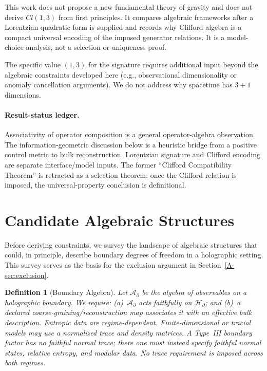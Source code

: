 \documentclass[12pt,a4paper,openany]{book}
\newtheorem{definition}[theorem]{Definition}
\begin{document}
This work does not propose a new fundamental theory of gravity and does not derive $Cl(1,3)$ from first principles.  It compares algebraic frameworks after a Lorentzian quadratic form is supplied and records why Clifford algebra is a compact universal encoding of the imposed generator relations.  It is a model-choice analysis, not a selection or uniqueness proof.

The specific value $(1,3)$ for the signature requires additional input beyond the algebraic constraints developed here (e.g., observational dimensionality or anomaly cancellation arguments).
We do not address why spacetime has $3+1$ dimensions.

\paragraph{Result-status ledger.}
Associativity of operator composition is a general operator-algebra observation.  The information-geometric discussion below is a heuristic bridge from a positive control metric to bulk reconstruction.  Lorentzian signature and Clifford encoding are separate interface/model inputs.  The former ``Clifford Compatibility Theorem'' is retracted as a selection theorem: once the Clifford relation is imposed, the universal-property conclusion is definitional.

\section{Candidate Algebraic Structures}
\label{A-sec:candidates}

Before deriving constraints, we survey the landscape of algebraic structures that could, in principle, describe boundary degrees of freedom in a holographic setting.
This survey serves as the basis for the exclusion argument in Section~\ref{A-sec:exclusion}.

\begin{definition}[Boundary Algebra]
Let $\mathcal{A}_\partial$ be the algebra of observables on a holographic boundary.
We require: (a)~$\mathcal{A}_\partial$ acts faithfully on $\mathcal{H}_\partial$; and (b)~a declared coarse-graining/reconstruction map associates it with an effective bulk description.  Entropic data are regime-dependent.  Finite-dimensional or tracial models may use a normalized trace and density matrices.  A Type~III boundary factor has no faithful normal trace; there one must instead specify faithful normal states, relative entropy, and modular data.  No trace requirement is imposed across both regimes.
\end{definition}
\end{document}

